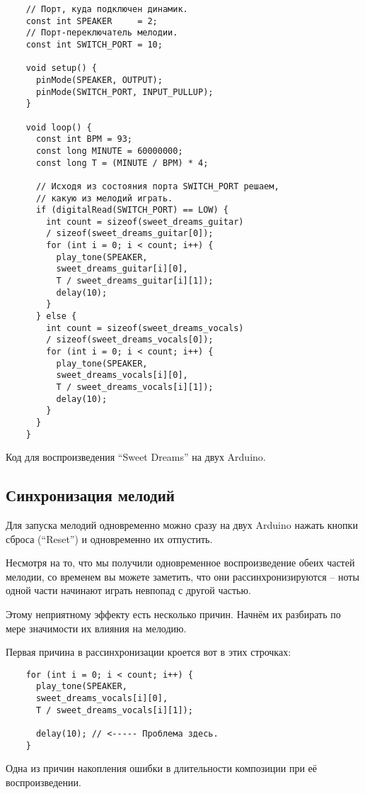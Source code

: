 \documentclass[../sparc.tex]{subfiles}
\begin{document}
\begin{listing}[!h]
  \begin{verbatim}
    // Порт, куда подключен динамик.
    const int SPEAKER     = 2;
    // Порт-переключатель мелодии.
    const int SWITCH_PORT = 10;

    void setup() {
      pinMode(SPEAKER, OUTPUT);
      pinMode(SWITCH_PORT, INPUT_PULLUP);
    }

    void loop() {
      const int BPM = 93;
      const long MINUTE = 60000000;
      const long T = (MINUTE / BPM) * 4;

      // Исходя из состояния порта SWITCH_PORT решаем,
      // какую из мелодий играть.
      if (digitalRead(SWITCH_PORT) == LOW) {
        int count = sizeof(sweet_dreams_guitar)
        / sizeof(sweet_dreams_guitar[0]);
        for (int i = 0; i < count; i++) {
          play_tone(SPEAKER,
          sweet_dreams_guitar[i][0],
          T / sweet_dreams_guitar[i][1]);
          delay(10);
        }
      } else {
        int count = sizeof(sweet_dreams_vocals)
        / sizeof(sweet_dreams_vocals[0]);
        for (int i = 0; i < count; i++) {
          play_tone(SPEAKER,
          sweet_dreams_vocals[i][0],
          T / sweet_dreams_vocals[i][1]);
          delay(10);
        }
      }
    }
  \end{verbatim}
  \label{listing:music-band-sweet-dreams-3}
  \caption{Код для воспроизведения ``Sweet Dreams'' на двух Arduino.}
\end{listing}

\newpage
\subsection{Синхронизация мелодий}

Для запуска мелодий одновременно можно сразу на двух Arduino нажать кнопки
сброса (``Reset'') и одновременно их отпустить.

Несмотря на то, что мы получили одновременное воспроизведение обеих частей
мелодии, со временем вы можете заметить, что они рассинхронизируются -- ноты
одной части начинают играть невпопад с другой частью.

Этому неприятному эффекту есть несколько причин.  Начнём их разбирать по мере
значимости их влияния на мелодию.

Первая причина в рассинхронизации кроется вот в этих строчках:

\begin{listing}[!h]
  \begin{verbatim}
    for (int i = 0; i < count; i++) {
      play_tone(SPEAKER,
      sweet_dreams_vocals[i][0],
      T / sweet_dreams_vocals[i][1]);

      delay(10); // <----- Проблема здесь.
    }
  \end{verbatim}
  \label{listing:music-band-problem-with-delay}
  \caption{Одна из причин накопления ошибки в длительности композиции при её
    воспроизведении.}
\end{listing}
\end{document}

